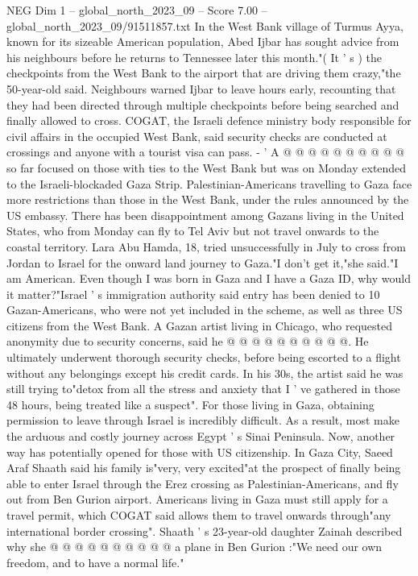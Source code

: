 \begin{textsample}{NEG Dim 1 – global\_north\_2023\_09 – Score 7.00 – global\_north\_2023\_09/91511857.txt}
In the West Bank village of Turmus Ayya, known for its sizeable American population, Abed Ijbar has sought advice from his neighbours before he returns to Tennessee later this month."( It ' s ) the checkpoints from the West Bank to the airport that are driving them crazy,"the 50-year-old said.
Neighbours warned Ijbar to leave hours early, recounting that they had been directed through multiple checkpoints before being searched and finally allowed to cross.
COGAT, the Israeli defence ministry body responsible for civil affairs in the occupied West Bank, said security checks are conducted at crossings and anyone with a tourist visa can pass. - ' A @ @ @ @ @ @ @ @ @ @ so far focused on those with ties to the West Bank but was on Monday extended to the Israeli-blockaded Gaza Strip.
Palestinian-Americans travelling to Gaza face more restrictions than those in the West Bank, under the rules announced by the US embassy.
There has been disappointment among Gazans living in the United States, who from Monday can fly to Tel Aviv but not travel onwards to the coastal territory.
Lara Abu Hamda, 18, tried unsuccessfully in July to cross from Jordan to Israel for the onward land journey to Gaza."I don't get it,"she said."I am American.
Even though I was born in Gaza and I have a Gaza ID, why would it matter?"Israel ' s immigration authority said entry has been denied to 10 Gazan-Americans, who were not yet included in the scheme, as well as three US citizens from the West Bank.
A Gazan artist living in Chicago, who requested anonymity due to security concerns, said he @ @ @ @ @ @ @ @ @ @.
He ultimately underwent thorough security checks, before being escorted to a flight without any belongings except his credit cards.
In his 30s, the artist said he was still trying to"detox from all the stress and anxiety that I ' ve gathered in those 48 hours, being treated like a suspect".
For those living in Gaza, obtaining permission to leave through Israel is incredibly difficult.
As a result, most make the arduous and costly journey across Egypt ' s Sinai Peninsula.
Now, another way has potentially opened for those with US citizenship.
In Gaza City, Saeed Araf Shaath said his family is"very, very excited"at the prospect of finally being able to enter Israel through the Erez crossing as Palestinian-Americans, and fly out from Ben Gurion airport.
Americans living in Gaza must still apply for a travel permit, which COGAT said allows them to travel onwards through"any international border crossing".
Shaath ' s 23-year-old daughter Zainah described why she @ @ @ @ @ @ @ @ @ @ a plane in Ben Gurion :"We need our own freedom, and to have a normal life."

\end{textsample}
